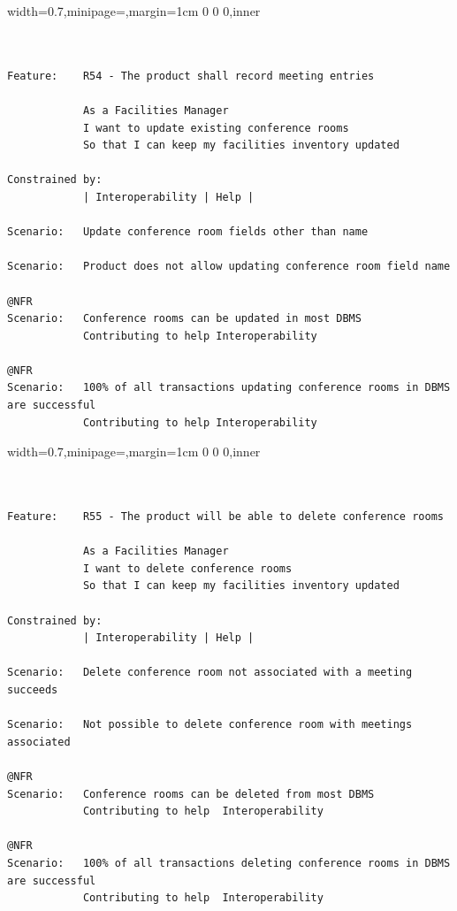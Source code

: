 \documentclass[dissertation,final]{softeng}
\newenvironment{featurecode}[1]
{ \lrbox\featurebox \begin{adjustbox}{width=#1\textwidth,minipage=\textwidth,margin=1cm 0 0 0,inner} }
{ \end{adjustbox}\endlrbox}
\newenvironment{featurelist}[2]
{
\newcommand{\setcaption}{\caption{#1}}
\newcommand{\setlabel}{\label{#2}}
}
{\begin{listing}[h!]\centering\usebox\featurebox\setcaption\setlabel\end{listing}}
\begin{document}
\begin{appendices}
\begin{featurelist}{R54 -- The product shall record meeting entries}{lst:feature_r54}
\begin{featurecode}{0.7}
\begin{verbatim}


Feature:    R54 - The product shall record meeting entries

            As a Facilities Manager
            I want to update existing conference rooms
            So that I can keep my facilities inventory updated
	
Constrained by:
            | Interoperability | Help |

Scenario:   Update conference room fields other than name

Scenario:   Product does not allow updating conference room field name

@NFR	
Scenario:   Conference rooms can be updated in most DBMS
            Contributing to help Interoperability

@NFR
Scenario:   100% of all transactions updating conference rooms in DBMS are successful
            Contributing to help Interoperability	
\end{verbatim}
\end{featurecode}
\end{featurelist}
\clearpage

\begin{featurelist}{R55 -- The product will be able to delete conference rooms}{lst:feature_r55}
\begin{featurecode}{0.7}
\begin{verbatim}


Feature:    R55 - The product will be able to delete conference rooms

            As a Facilities Manager
            I want to delete conference rooms
            So that I can keep my facilities inventory updated
		
Constrained by:
            | Interoperability | Help |

Scenario:   Delete conference room not associated with a meeting succeeds

Scenario:   Not possible to delete conference room with meetings associated

@NFR	
Scenario:   Conference rooms can be deleted from most DBMS
            Contributing to help  Interoperability

@NFR
Scenario:   100% of all transactions deleting conference rooms in DBMS are successful
            Contributing to help  Interoperability
\end{verbatim}
\end{featurecode}
\end{featurelist}


\end{appendices}
\end{document}
